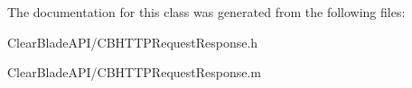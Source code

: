 The documentation for this class was generated from the following files\+:\begin{DoxyCompactItemize}
\item 
Clear\+Blade\+A\+P\+I/C\+B\+H\+T\+T\+P\+Request\+Response.\+h\item 
Clear\+Blade\+A\+P\+I/C\+B\+H\+T\+T\+P\+Request\+Response.\+m\end{DoxyCompactItemize}
